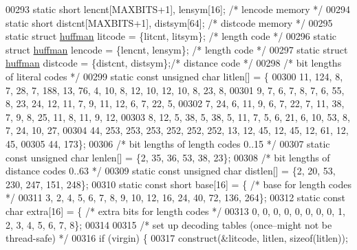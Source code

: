 \begin{DoxyCode}
00293     \textcolor{keyword}{static} \textcolor{keywordtype}{short} lencnt[MAXBITS+1], lensym[16];         \textcolor{comment}{/* lencode memory */}
00294     \textcolor{keyword}{static} \textcolor{keywordtype}{short} distcnt[MAXBITS+1], distsym[64];       \textcolor{comment}{/* distcode memory */}
00295     \textcolor{keyword}{static} \textcolor{keyword}{struct }\hyperlink{structhuffman}{huffman} litcode = \{litcnt, litsym\};   \textcolor{comment}{/* length code */}
00296     \textcolor{keyword}{static} \textcolor{keyword}{struct }\hyperlink{structhuffman}{huffman} lencode = \{lencnt, lensym\};   \textcolor{comment}{/* length code */}
00297     \textcolor{keyword}{static} \textcolor{keyword}{struct }\hyperlink{structhuffman}{huffman} distcode = \{distcnt, distsym\};\textcolor{comment}{/* distance code */}
00298         \textcolor{comment}{/* bit lengths of literal codes */}
00299     \textcolor{keyword}{static} \textcolor{keyword}{const} \textcolor{keywordtype}{unsigned} \textcolor{keywordtype}{char} litlen[] = \{
00300         11, 124, 8, 7, 28, 7, 188, 13, 76, 4, 10, 8, 12, 10, 12, 10, 8, 23, 8,
00301         9, 7, 6, 7, 8, 7, 6, 55, 8, 23, 24, 12, 11, 7, 9, 11, 12, 6, 7, 22, 5,
00302         7, 24, 6, 11, 9, 6, 7, 22, 7, 11, 38, 7, 9, 8, 25, 11, 8, 11, 9, 12,
00303         8, 12, 5, 38, 5, 38, 5, 11, 7, 5, 6, 21, 6, 10, 53, 8, 7, 24, 10, 27,
00304         44, 253, 253, 253, 252, 252, 252, 13, 12, 45, 12, 45, 12, 61, 12, 45,
00305         44, 173\};
00306         \textcolor{comment}{/* bit lengths of length codes 0..15 */}
00307     \textcolor{keyword}{static} \textcolor{keyword}{const} \textcolor{keywordtype}{unsigned} \textcolor{keywordtype}{char} lenlen[] = \{2, 35, 36, 53, 38, 23\};
00308         \textcolor{comment}{/* bit lengths of distance codes 0..63 */}
00309     \textcolor{keyword}{static} \textcolor{keyword}{const} \textcolor{keywordtype}{unsigned} \textcolor{keywordtype}{char} distlen[] = \{2, 20, 53, 230, 247, 151, 248\};
00310     \textcolor{keyword}{static} \textcolor{keyword}{const} \textcolor{keywordtype}{short} base[16] = \{     \textcolor{comment}{/* base for length codes */}
00311         3, 2, 4, 5, 6, 7, 8, 9, 10, 12, 16, 24, 40, 72, 136, 264\};
00312     \textcolor{keyword}{static} \textcolor{keyword}{const} \textcolor{keywordtype}{char} extra[16] = \{     \textcolor{comment}{/* extra bits for length codes */}
00313         0, 0, 0, 0, 0, 0, 0, 0, 1, 2, 3, 4, 5, 6, 7, 8\};
00314 
00315     \textcolor{comment}{/* set up decoding tables (once--might not be thread-safe) */}
00316     \textcolor{keywordflow}{if} (virgin) \{
00317         construct(&litcode, litlen, \textcolor{keyword}{sizeof}(litlen));

\end{DoxyCode}
